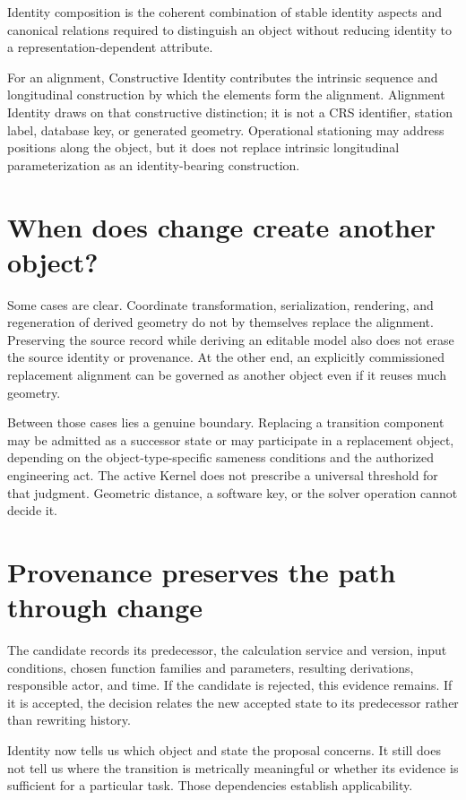 \begin{definition}
\label{def:identity-composition}
Identity composition is the coherent combination of stable identity aspects
and canonical relations required to distinguish an object without reducing
identity to a representation-dependent attribute.
\end{definition}

For an alignment, Constructive Identity contributes the intrinsic sequence and
longitudinal construction by which the elements form the alignment. Alignment
Identity draws on that constructive distinction; it is not a CRS identifier,
station label, database key, or generated geometry. Operational stationing may
address positions along the object, but it does not replace intrinsic
longitudinal parameterization as an identity-bearing construction.

\section{When does change create another object?}

Some cases are clear. Coordinate transformation, serialization, rendering,
and regeneration of derived geometry do not by themselves replace the
alignment. Preserving the source record while deriving an editable model also
does not erase the source identity or provenance. At the other end, an
explicitly commissioned replacement alignment can be governed as another
object even if it reuses much geometry.

Between those cases lies a genuine boundary. Replacing a transition component
may be admitted as a successor state or may participate in a replacement
object, depending on the object-type-specific sameness conditions and the
authorized engineering act. The active Kernel does not prescribe a universal
threshold for that judgment. Geometric distance, a software key, or the solver
operation cannot decide it.

\section{Provenance preserves the path through change}

The candidate records its predecessor, the calculation service and version,
input conditions, chosen function families and parameters, resulting
derivations, responsible actor, and time. If the candidate is rejected, this
evidence remains. If it is accepted, the decision relates the new accepted
state to its predecessor rather than rewriting history.

Identity now tells us which object and state the proposal concerns. It still
does not tell us where the transition is metrically meaningful or whether its
evidence is sufficient for a particular task. Those dependencies establish
applicability.
